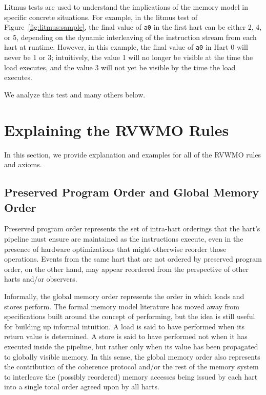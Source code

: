 Litmus tests are used to understand the implications of the memory model in specific concrete situations.
For example, in the litmus test of Figure~\ref{fig:litmus:sample}, the final value of {\tt a0} in the first hart can be either 2, 4, or 5, depending on the dynamic interleaving of the instruction stream from each hart at runtime.
However, in this example, the final value of {\tt a0} in Hart 0 will never be 1 or 3; intuitively, the value 1 will no longer be visible at the time the load executes, and the value 3 will not yet be visible by the time the load executes.

We analyze this test and many others below.

\section{Explaining the RVWMO Rules}
In this section, we provide explanation and examples for all of the RVWMO rules and axioms.

\subsection{Preserved Program Order and Global Memory Order}
Preserved program order represents the set of intra-hart orderings that the hart's pipeline must ensure are maintained as the instructions execute, even in the presence of hardware optimizations that might otherwise reorder those operations.
Events from the same hart that are not ordered by preserved program order, on the other hand, may appear reordered from the perspective of other harts and/or observers.

Informally, the global memory order represents the order in which loads and stores perform.
The formal memory model literature has moved away from specifications built around the concept of performing, but the idea is still useful for building up informal intuition.
A load is said to have performed when its return value is determined.
A store is said to have performed not when it has executed inside the pipeline, but rather only when its value has been propagated to globally visible memory.
In this sense, the global memory order also represents the contribution of the coherence protocol and/or the rest of the memory system to interleave the (possibly reordered) memory accesses being issued by each hart into a single total order agreed upon by all harts.

